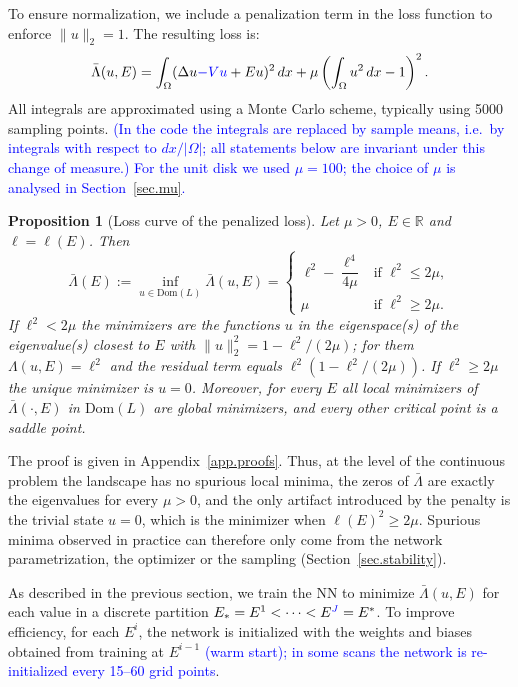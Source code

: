 \documentclass[10pt]{amsart}
\newcommand{\rev}[1]{\textcolor{blue}{#1}}
\newenvironment{revblock}{\color{blue}}{}
\theoremstyle{definition}
\theoremstyle{remark}
\theoremstyle{plain}
\newtheorem{proposition}[theorem]{Proposition}
\newcommand{\R}{\mathbb{R}}
\begin{document}
To ensure normalization, we include a penalization term in the loss function to enforce $\|u\|_2=1$. The resulting loss is:
\begin{equation}\label{lossmu}
\bar \Lambda(u, E) = \int_\Omega (\Delta u \rev{-Vu} + Eu)^2\, dx + \mu\left(\int_\Omega u^2\, dx - 1\right)^2.
\end{equation}
All integrals are approximated using a Monte Carlo scheme, typically using 5000 sampling points.
\rev{(In the code the integrals are replaced by sample means, i.e.\ by integrals with respect to
$dx/|\Omega|$; all statements below are invariant under this change of measure.) For the unit disk
we used $\mu=100$; the choice of $\mu$ is analysed in Section~\ref{sec.mu}.}

\begin{revblock}
\begin{proposition}[Loss curve of the penalized loss]\label{prop.penalized}
Let $\mu>0$, $E\in\R$ and $\ell=\ell(E)$. Then
\[
\bar\Lambda(E):=\inf_{u\in \mathrm{Dom}(L)}\bar\Lambda(u,E)=
\begin{cases}
\ell^2-\dfrac{\ell^4}{4\mu} & \text{if } \ell^2\le 2\mu,\\[2mm]
\mu & \text{if } \ell^2\ge 2\mu .
\end{cases}
\]
If $\ell^2<2\mu$ the minimizers are the functions $u$ in the eigenspace(s) of the eigenvalue(s)
closest to $E$ with $\|u\|_2^2=1-\ell^2/(2\mu)$; for them $\Lambda(u,E)=\ell^2$ and the residual term
equals $\ell^2(1-\ell^2/(2\mu))$. If $\ell^2\ge2\mu$ the unique minimizer is $u=0$. Moreover, for every $E$
all local minimizers of $\bar\Lambda(\cdot,E)$ in $\mathrm{Dom}(L)$ are global minimizers, and every other
critical point is a saddle point.
\end{proposition}
The proof is given in Appendix~\ref{app.proofs}. Thus, at the level of the continuous problem the
landscape has no spurious local minima, the zeros of $\bar\Lambda$ are exactly the eigenvalues for
every $\mu>0$, and the only artifact introduced by the penalty is the trivial state $u=0$, which is
the minimizer when $\ell(E)^2\ge2\mu$. Spurious minima observed in practice can therefore only come
from the network parametrization, the optimizer or the sampling (Section~\ref{sec.stability}).
\end{revblock}

As described in the previous section, we train the NN to minimize $\bar\Lambda(u, E)$ for each value in a discrete partition $E_* = E^1<\cdots<E^{\rev{J}}=E^*$. To improve efficiency, for each $E^i$, the network is initialized with the weights and biases obtained from training at $E^{i-1}$ \rev{(warm start); in some scans the network is re-initialized every 15--60 grid points}.
\end{document}
